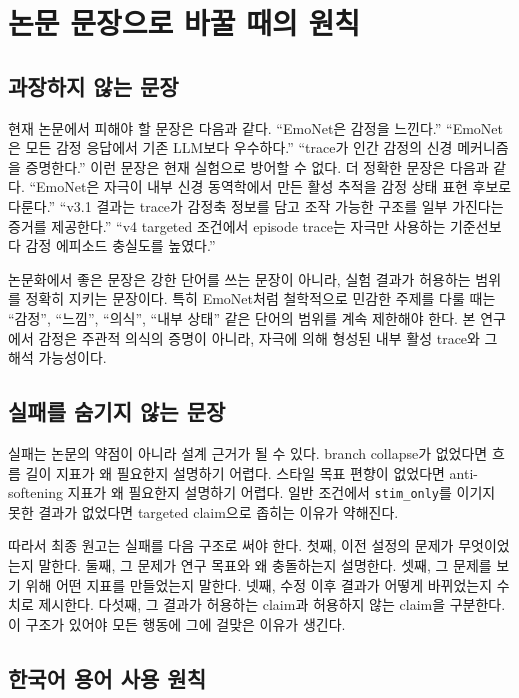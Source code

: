 \documentclass[11pt,a4paper]{article}
\newcommand{\eng}[1]{\texttt{#1}}
\begin{document}
\section{논문 문장으로 바꿀 때의 원칙}

\subsection{과장하지 않는 문장}

현재 논문에서 피해야 할 문장은 다음과 같다. ``EmoNet은 감정을 느낀다.'' ``EmoNet은 모든 감정 응답에서 기존 LLM보다 우수하다.'' ``trace가 인간 감정의 신경 메커니즘을 증명한다.'' 이런 문장은 현재 실험으로 방어할 수 없다. 더 정확한 문장은 다음과 같다. ``EmoNet은 자극이 내부 신경 동역학에서 만든 활성 추적을 감정 상태 표현 후보로 다룬다.'' ``v3.1 결과는 trace가 감정축 정보를 담고 조작 가능한 구조를 일부 가진다는 증거를 제공한다.'' ``v4 targeted 조건에서 episode trace는 자극만 사용하는 기준선보다 감정 에피소드 충실도를 높였다.''

논문화에서 좋은 문장은 강한 단어를 쓰는 문장이 아니라, 실험 결과가 허용하는 범위를 정확히 지키는 문장이다. 특히 EmoNet처럼 철학적으로 민감한 주제를 다룰 때는 ``감정'', ``느낌'', ``의식'', ``내부 상태'' 같은 단어의 범위를 계속 제한해야 한다. 본 연구에서 감정은 주관적 의식의 증명이 아니라, 자극에 의해 형성된 내부 활성 trace와 그 해석 가능성이다.

\subsection{실패를 숨기지 않는 문장}

실패는 논문의 약점이 아니라 설계 근거가 될 수 있다. branch collapse가 없었다면 흐름 길이 지표가 왜 필요한지 설명하기 어렵다. 스타일 목표 편향이 없었다면 anti-softening 지표가 왜 필요한지 설명하기 어렵다. 일반 조건에서 \eng{stim\_only}를 이기지 못한 결과가 없었다면 targeted claim으로 좁히는 이유가 약해진다.

따라서 최종 원고는 실패를 다음 구조로 써야 한다. 첫째, 이전 설정의 문제가 무엇이었는지 말한다. 둘째, 그 문제가 연구 목표와 왜 충돌하는지 설명한다. 셋째, 그 문제를 보기 위해 어떤 지표를 만들었는지 말한다. 넷째, 수정 이후 결과가 어떻게 바뀌었는지 수치로 제시한다. 다섯째, 그 결과가 허용하는 claim과 허용하지 않는 claim을 구분한다. 이 구조가 있어야 모든 행동에 그에 걸맞은 이유가 생긴다.

\subsection{한국어 용어 사용 원칙}
\end{document}
